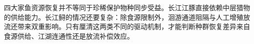 四大家鱼资源恢复并不等同于珍稀保护物种同步受益。长江江豚直接依赖中层猎物的供给能力。长江鲟的情况还要复杂：除食源限制外，洄游通道阻隔与人工增殖放流还带来双重影响。只有厘清这两类不同的驱动机制，才能判断种群恢复差异来自食源供给、江湖连通性还是放流补偿效应。
